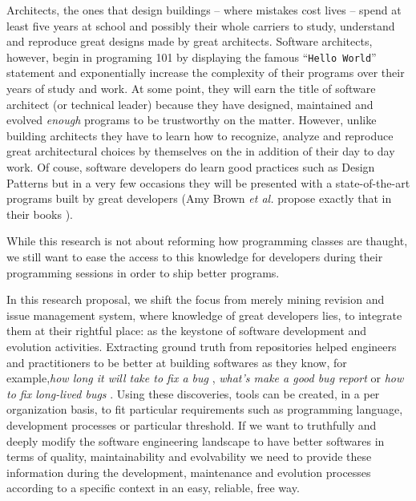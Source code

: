 Architects, the ones that design buildings -- where mistakes cost lives -- spend at least five years at school and possibly their whole carriers to study, understand and reproduce great designs made by great architects. 
Software architects, however, begin in programing 101 by displaying the famous ``{\tt Hello World}'' statement and exponentially increase the complexity of their programs over their years of study and work. 
At some point, they will earn the title of software architect (or technical leader) because they have designed, maintained and evolved {\it enough} programs to be trustworthy on the matter. 
However, unlike building architects they have to learn how to recognize, analyze and reproduce great architectural choices by themselves on the in addition of their day to day work. 
Of couse, software developers do learn good practices such as Design Patterns \cite{Gamma2008} but in a very few occasions they will be presented with a state-of-the-art programs built by great developers (Amy Brown {\it et al.} propose exactly that in their books \cite{chansler2011architecture, AmyBrown2012,Armstrong2013}).

While this research is not about reforming how programming classes are thaught, we still want to ease the access to this knowledge for developers during their programming sessions in order to ship better programs.

In this research proposal, we shift the focus from merely mining revision and issue management system, where knowledge of great developers lies, to integrate them at their rightful place: as the keystone of software development and evolution activities. 
Extracting ground truth from repositories helped engineers and practitioners to be better at building softwares as they know, for example,{\it how long it will take to fix a bug} \cite{Weiss2007}, {\it what's make a good bug report} \cite{Bettenburg2008} or {\it how to fix long-lived bugs} \cite{Saha2014}.
Using these discoveries, tools can be created, in a per organization basis, to fit particular requirements such as programming language, development processes or particular threshold. If we want to truthfully and deeply modify the software engineering landscape to have better softwares in terms of quality, maintainability and evolvability we need to provide these information during the development, maintenance and evolution processes according to a specific context in an easy, reliable, free way.

